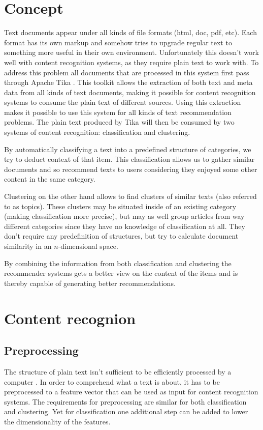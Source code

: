 \documentclass[twocolumn]{phdsymp} %
\begin{document}
\section{Concept}
Text documents appear under all kinds of file formats (html, doc, pdf, etc). Each format has its own markup and somehow tries to upgrade regular text to something more useful in their own environment. Unfortunately this doesn't work well with content recognition systems, as they require plain text to work with. To address this problem all documents that are processed in this system first pass through Apache Tika \cite{tika}. This toolkit allows the extraction of both text and meta data from all kinds of text documents, making it possible for content recognition systems to consume the plain text of different sources. Using this extraction makes it possible to use this system for all kinds of text recommendation problems. The plain text produced by Tika will then be consumed by two systems of content recognition: classification and clustering.

By automatically classifying a text into a predefined structure of categories, we try to deduct context of that item. This classification allows us to gather similar documents and so recommend texts to users considering they enjoyed some other content in the same category.

Clustering on the other hand allows to find clusters of similar texts (also referred to as topics). These clusters may be situated inside of an existing category (making classification more precise), but may as well group articles from way different categories since they have no knowledge of classification at all. They don't require any predefinition of structures, but try to calculate document similarity in an $n$-dimensional space.

By combining the information from both classification and clustering the recommender systems gets a better view on the content of the items and is thereby capable of generating better recommendations.

\section{Content recognion}
\subsection{Preprocessing}
The structure of plain text isn't sufficient to be efficiently processed by a computer \cite{Hotho2005}. In order to comprehend what a text is about, it has to be preprocessed to a feature vector that can be used as input for content recognition systems. The requirements for preprocessing are similar for both classification and clustering. Yet for classification one additional step can be added to lower the dimensionality of the features.
\end{document}
